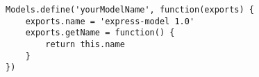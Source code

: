 

\lstset{language=C}

\begin{lstlisting}[frame=single]
Models.define('yourModelName', function(exports) {
	exports.name = 'express-model 1.0'
	exports.getName = function() {
		return this.name
	}
})
\end{lstlisting}